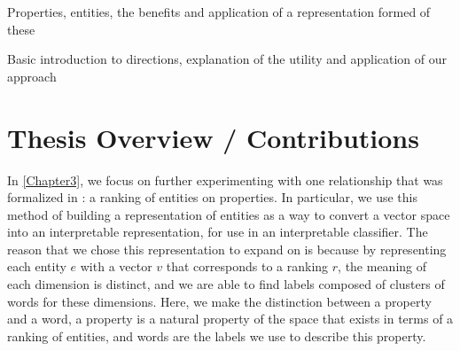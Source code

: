 
Properties, entities, the benefits and application of a representation formed of these

Basic introduction to directions, explanation of the utility and application of our approach
\section{Thesis Overview / Contributions}


In \ref{Chapter3}, we focus on further experimenting with one relationship that was formalized in \cite{Derrac2015}: a ranking of entities on properties. In particular, we use this method of building a representation of entities as a way to convert a vector space into an interpretable representation, for use in an interpretable classifier. The reason that we chose this representation to expand on is because by representing each entity $e$ with a vector $v$ that corresponds to a ranking $r$, the meaning of each dimension is distinct, and we are able to find labels composed of clusters of words for these dimensions. Here, we make the distinction between a property and a word, a property is a natural property of the space that exists in terms of a ranking of entities, and words are the labels we use to describe this property.